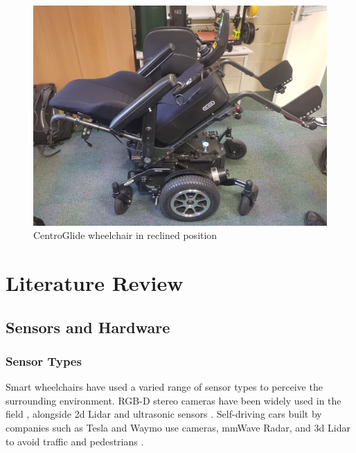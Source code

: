 \documentclass[12pt]{article}
\begin{document}
\begin{figure}[H]
    \centering
    \includegraphics[width=0.4\linewidth]{images/wheelchair_reclined.jpg}
    \caption{CentroGlide wheelchair in reclined position}
    \label{fig:wheelchair_reclined}
\end{figure}

\pagebreak





\section{Literature Review}


\subsection{Sensors and Hardware}

\subsubsection{Sensor Types}
Smart wheelchairs have used a varied range of sensor types to perceive the surrounding environment.
RGB-D stereo cameras have been widely used in the field \cite{wangS2P2SelfSupervisedGoalDirected2021}\cite{wangSelfSupervisedDrivableArea2019}\cite{jainAutomatedPerceptionSafe2014},
alongside 2d Lidar \cite{scudellariSelfdrivingWheelchairsDebut2017} and ultrasonic sensors \cite{levineNavChairAssistiveWheelchair1999}.
Self-driving cars built by companies such as Tesla and Waymo
use cameras, mmWave Radar, and 3d Lidar to avoid traffic and pedestrians \cite{karpathyTeslaAIDay2021}.
\end{document}

